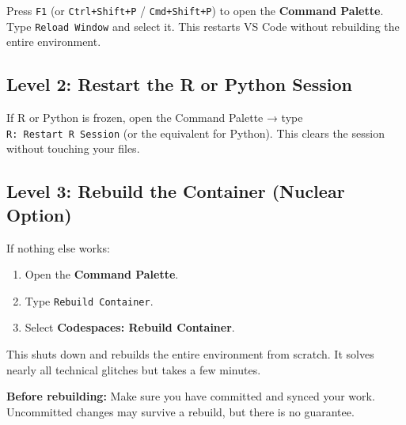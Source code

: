 \documentclass[
  letterpaper,
  DIV=11,
  numbers=noendperiod,
  oneside]{scrreprt}
\providecommand{\tightlist}{%
  \setlength{\itemsep}{0pt}\setlength{\parskip}{0pt}}
\begin{document}
Press \texttt{F1} (or \texttt{Ctrl+Shift+P} / \texttt{Cmd+Shift+P}) to
open the \textbf{Command Palette}. Type \texttt{Reload\ Window} and
select it. This restarts VS Code without rebuilding the entire
environment.

\subsection*{Level 2: Restart the R or Python
Session}\label{level-2-restart-the-r-or-python-session}

If R or Python is frozen, open the Command Palette → type
\texttt{R:\ Restart\ R\ Session} (or the equivalent for Python). This
clears the session without touching your files.

\subsection*{Level 3: Rebuild the Container (Nuclear
Option)}\label{level-3-rebuild-the-container-nuclear-option}

If nothing else works:

\begin{enumerate}
\def\labelenumi{\arabic{enumi}.}
\tightlist
\item
  Open the \textbf{Command Palette}.
\item
  Type \texttt{Rebuild\ Container}.
\item
  Select \textbf{Codespaces: Rebuild Container}.
\end{enumerate}

This shuts down and rebuilds the entire environment from scratch. It
solves nearly all technical glitches but takes a few minutes.

\begin{tcolorbox}[enhanced jigsaw, title=\textcolor{quarto-callout-warning-color}{\faExclamationTriangle}\hspace{0.5em}{Warning}, arc=.35mm, toptitle=1mm, colframe=quarto-callout-warning-color-frame, toprule=.15mm, leftrule=.75mm, bottomtitle=1mm, opacityback=0, bottomrule=.15mm, coltitle=black, breakable, opacitybacktitle=0.6, titlerule=0mm, colback=white, left=2mm, colbacktitle=quarto-callout-warning-color!10!white, rightrule=.15mm]

\textbf{Before rebuilding:} Make sure you have committed and synced your
work. Uncommitted changes may survive a rebuild, but there is no
guarantee.

\end{tcolorbox}
\end{document}
